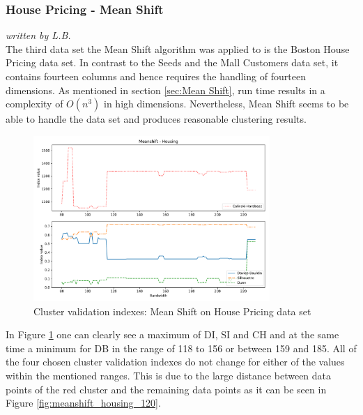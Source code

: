 \subsubsection{House Pricing - Mean Shift}
\textit{written by L.B.}\\

The third data set the Mean Shift algorithm was applied to is the Boston House Pricing data set. In contrast to the Seeds and the Mall Customers data set, it contains fourteen columns and hence requires the handling of fourteen dimensions. As mentioned in section \ref{sec:Mean Shift}, run time results in a complexity of $O(n^{3})$ in high dimensions. 
Nevertheless, Mean Shift seems to be able to handle the data set and produces reasonable clustering results. 

\begin{figure}[H]
\begin{center}
\includegraphics[width=0.8\textwidth]{images/Meanshift_-_Housing.pdf}
\end{center}
\caption{Cluster validation indexes: Mean Shift on House Pricing data set}
\label{fig:meanshift_housing_indexes}
\end{figure}

In Figure \ref{fig:meanshift_housing_indexes} one can clearly see a maximum of \gls{DI}, \gls{SI} and \gls{CH} and at the same time a minimum for \gls{DB} in the range of 118 to 156 or between 159 and 185. All of the four chosen cluster validation indexes do not change for either of the values within the mentioned ranges. This is due to the large distance between data points of the red cluster and the remaining data points as it can be seen in Figure \ref{fig:meanshift_housing_120}.

